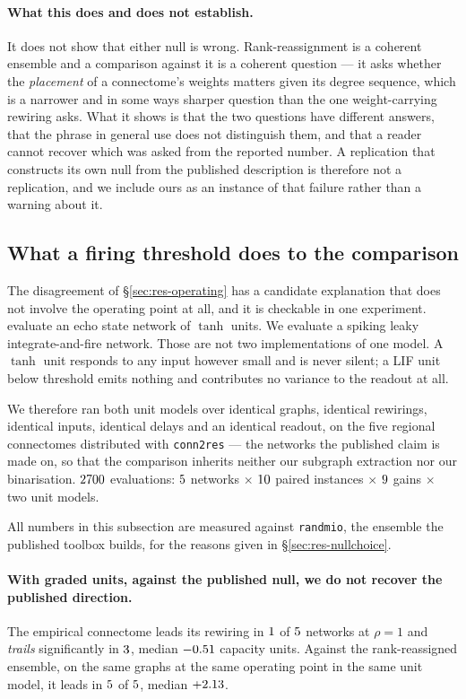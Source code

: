 \paragraph{What this does and does not establish.}
It does not show that either null is wrong. Rank-reassignment is a coherent ensemble and
a comparison against it is a coherent question --- it asks whether the \emph{placement} of
a connectome's weights matters given its degree sequence, which is a narrower and in some
ways sharper question than the one weight-carrying rewiring asks. What it shows is that
the two questions have different answers, that the phrase in general use does not
distinguish them, and that a reader cannot recover which was asked from the reported
number. A replication that constructs its own null from the published description is
therefore not a replication, and we include ours as an instance of that failure rather
than a warning about it.

\subsection{What a firing threshold does to the comparison}
\label{sec:res-unit}

The disagreement of \S\ref{sec:res-operating} has a candidate explanation that does not
involve the operating point at all, and it is checkable in one experiment.
\cite{suarez2024connectome} evaluate an echo state network of $\tanh$ units. We evaluate
a spiking leaky integrate-and-fire network. Those are not two implementations of one
model. A $\tanh$ unit responds to any input however small and is never silent; a LIF unit
below threshold emits nothing and contributes no variance to the readout at all.

We therefore ran both unit models over identical graphs, identical rewirings, identical
inputs, identical delays and an identical readout, on the five regional connectomes
distributed with \texttt{conn2res} --- the networks the published claim is made on, so
that the comparison inherits neither our subgraph extraction nor our binarisation.
$2700$ evaluations: $5$ networks $\times$ $10$
paired instances $\times$ $9$ gains $\times$ two unit models.

All numbers in this subsection are measured against \texttt{randmio}, the ensemble the
published toolbox builds, for the reasons given in \S\ref{sec:res-nullchoice}.

\paragraph{With graded units, against the published null, we do not recover the published
direction.}
The empirical connectome leads its rewiring in $1$ of $5$
networks at $\rho = 1$ and \emph{trails} significantly in $3$, median
$-0.51$ capacity units. Against the rank-reassigned ensemble, on the same graphs
at the same operating point in the same unit model, it leads in $5$ of
$5$, median $+2.13$.

